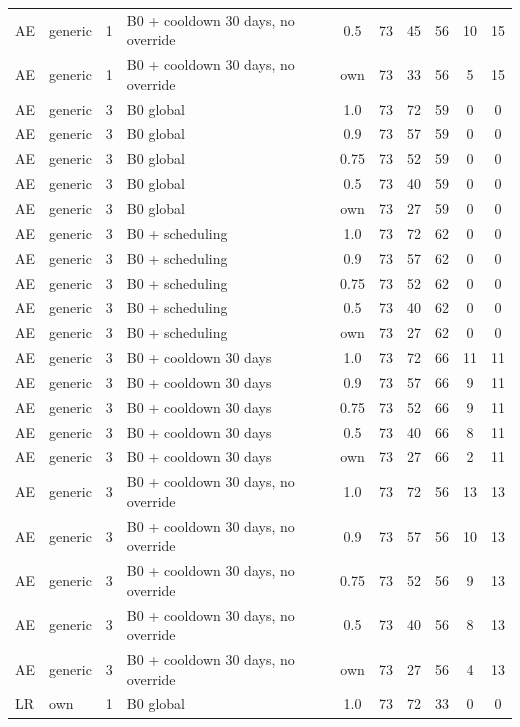 \documentclass[10pt,onecolumn,letterpaper]{article}
\begin{document}
\begin{longtable}{lllp{4.4cm}cccccc}
AE & generic & 1 & B0 + cooldown 30 days, no override & 0.5 & 73 & 45 & 56 & 10 & 15 \\
AE & generic & 1 & B0 + cooldown 30 days, no override & own & 73 & 33 & 56 & 5 & 15 \\
AE & generic & 3 & B0 global & 1.0 & 73 & 72 & 59 & 0 & 0 \\
AE & generic & 3 & B0 global & 0.9 & 73 & 57 & 59 & 0 & 0 \\
AE & generic & 3 & B0 global & 0.75 & 73 & 52 & 59 & 0 & 0 \\
AE & generic & 3 & B0 global & 0.5 & 73 & 40 & 59 & 0 & 0 \\
AE & generic & 3 & B0 global & own & 73 & 27 & 59 & 0 & 0 \\
AE & generic & 3 & B0 + scheduling & 1.0 & 73 & 72 & 62 & 0 & 0 \\
AE & generic & 3 & B0 + scheduling & 0.9 & 73 & 57 & 62 & 0 & 0 \\
AE & generic & 3 & B0 + scheduling & 0.75 & 73 & 52 & 62 & 0 & 0 \\
AE & generic & 3 & B0 + scheduling & 0.5 & 73 & 40 & 62 & 0 & 0 \\
AE & generic & 3 & B0 + scheduling & own & 73 & 27 & 62 & 0 & 0 \\
AE & generic & 3 & B0 + cooldown 30 days & 1.0 & 73 & 72 & 66 & 11 & 11 \\
AE & generic & 3 & B0 + cooldown 30 days & 0.9 & 73 & 57 & 66 & 9 & 11 \\
AE & generic & 3 & B0 + cooldown 30 days & 0.75 & 73 & 52 & 66 & 9 & 11 \\
AE & generic & 3 & B0 + cooldown 30 days & 0.5 & 73 & 40 & 66 & 8 & 11 \\
AE & generic & 3 & B0 + cooldown 30 days & own & 73 & 27 & 66 & 2 & 11 \\
AE & generic & 3 & B0 + cooldown 30 days, no override & 1.0 & 73 & 72 & 56 & 13 & 13 \\
AE & generic & 3 & B0 + cooldown 30 days, no override & 0.9 & 73 & 57 & 56 & 10 & 13 \\
AE & generic & 3 & B0 + cooldown 30 days, no override & 0.75 & 73 & 52 & 56 & 9 & 13 \\
AE & generic & 3 & B0 + cooldown 30 days, no override & 0.5 & 73 & 40 & 56 & 8 & 13 \\
AE & generic & 3 & B0 + cooldown 30 days, no override & own & 73 & 27 & 56 & 4 & 13 \\
LR & own & 1 & B0 global & 1.0 & 73 & 72 & 33 & 0 & 0 \\

\end{longtable}
\end{document}
